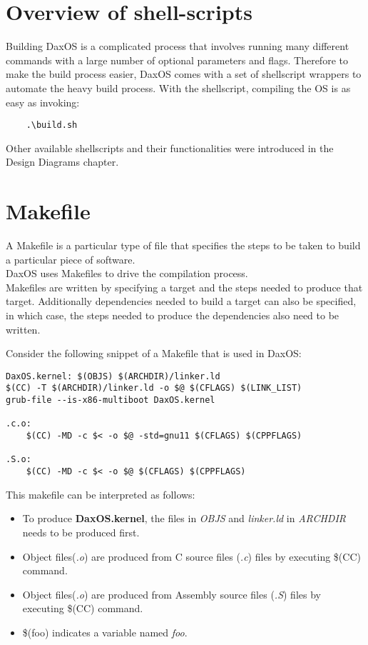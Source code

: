 \section{Overview of shell-scripts}\label{section:Overview of shell-script}
Building DaxOS is a complicated process that involves running many different commands
with a large number of optional parameters and flags. Therefore to make the build process easier,
DaxOS comes with a set of shellscript wrappers to automate the heavy build process.
With the shellscript, compiling the OS is as easy as invoking:
\begin{lstlisting}
    .\build.sh
\end{lstlisting}

Other available shellscripts and their functionalities were introduced in the Design Diagrams chapter.

\section{Makefile}\label{section:Makefile}
A Makefile is a particular type of file that specifies the steps to be taken to build a particular piece of software.\\
DaxOS uses Makefiles to drive the compilation process.\\
Makefiles are written by specifying a target and the steps needed
to produce that target. Additionally dependencies needed to build a target can also be specified, in which case, the steps needed
to produce the dependencies also need to be written.
\pagebreak

Consider the following snippet of a Makefile that is used in DaxOS:

\vspace{0.5cm}
\lstset{language=make}

\begin{lstlisting}
DaxOS.kernel: $(OBJS) $(ARCHDIR)/linker.ld
$(CC) -T $(ARCHDIR)/linker.ld -o $@ $(CFLAGS) $(LINK_LIST)
grub-file --is-x86-multiboot DaxOS.kernel

.c.o:
    $(CC) -MD -c $< -o $@ -std=gnu11 $(CFLAGS) $(CPPFLAGS)

.S.o:
    $(CC) -MD -c $< -o $@ $(CFLAGS) $(CPPFLAGS)
\end{lstlisting}

This makefile can be interpreted as follows:
\begin{itemize}
    \item To produce \textbf{DaxOS.kernel}, the files in \textit{OBJS} and \textit{linker.ld} in \textit{ARCHDIR} needs to be produced first.
    \item Object files(\textit{.o}) are produced from C source files (\textit{.c}) files by executing \$(CC) command.
    \item Object files(\textit{.o}) are produced from Assembly source files (\textit{.S}) files by executing \$(CC) command.
    \item \$(foo) indicates a variable named \textit{foo}.
\end{itemize}

